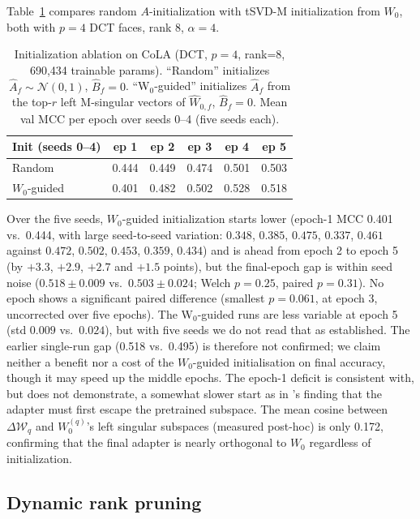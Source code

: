 \documentclass{article}
\newcommand{\DeltaW}{\Delta\mathcal{W}}
\theoremstyle{plain}
\begin{document}
Table~\ref{tab:init} compares random $A$-initialization with tSVD-M initialization
from $W_0$, both with $p=4$ DCT faces, rank 8, $\alpha=4$.

\begin{table}[h]
\centering
\caption{Initialization ablation on CoLA (DCT, $p=4$, rank=8, 690,434 trainable params).
``Random'' initializes $\hat{A}_f \sim \mathcal{N}(0,1)$, $\hat{B}_f=0$.
``W$_0$-guided'' initializes $\hat{A}_f$ from the top-$r$ left M-singular vectors of $\hat{W}_{0,f}$,
$\hat{B}_f=0$.
Mean val MCC per epoch over seeds 0--4 (five seeds each).}
\label{tab:init}
\begin{tabular}{lccccc}
\toprule
Init (seeds 0--4) & ep 1 & ep 2 & ep 3 & ep 4 & ep 5 \\
\midrule
Random         & 0.444 & 0.449 & 0.474 & 0.501 & 0.503 \\
$W_0$-guided   & 0.401 & 0.482 & 0.502 & 0.528 & 0.518 \\
\bottomrule
\end{tabular}
\end{table}

\noindent
Over the five seeds, $W_0$-guided initialization starts lower (epoch-1 MCC 0.401 vs.\ 0.444, with large seed-to-seed variation:
$0.348$, $0.385$, $0.475$, $0.337$, $0.461$ against $0.472$, $0.502$, $0.453$, $0.359$, $0.434$)
and is ahead from epoch 2 to epoch 5 (by $+3.3$, $+2.9$, $+2.7$ and $+1.5$ points), but the final-epoch gap is within seed noise
($0.518\pm0.009$ vs.\ $0.503\pm0.024$; Welch $p=0.25$, paired $p=0.31$).
No epoch shows a significant paired difference (smallest $p=0.061$, at epoch 3, uncorrected over five epochs).
The W$_0$-guided runs are less variable at epoch 5 (std $0.009$ vs.\ $0.024$), but with five seeds we do not read that as established.
The earlier single-run gap (0.518 vs.\ 0.495) is therefore not confirmed; we claim neither a benefit nor a cost of the
$W_0$-guided initialisation on final accuracy, though it may speed up the middle epochs.
The epoch-1 deficit is consistent with, but does not demonstrate, a somewhat slower start as in \citet{bershatsky2024lotr}'s finding that the adapter must first
escape the pretrained subspace.
The mean cosine between $\DeltaW_q$ and $W_0^{(q)}$'s left singular subspaces
(measured post-hoc) is only 0.172, confirming that the final adapter is nearly
orthogonal to $W_0$ regardless of initialization.

\subsection{Dynamic rank pruning}
\label{sec:pruning_exp}
\end{document}
